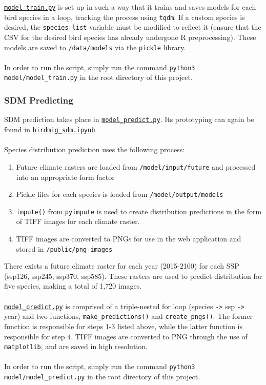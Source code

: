 \documentclass{article}
\begin{document}
\noindent \texttt{\href{run:../model/model\_train.py}{model\_train.py}} is set up in such a way that it trains and saves models for each bird species in a loop, tracking the process using \texttt{tqdm}. If a custom species is desired, the \texttt{species\_list} variable must be modified to reflect it (ensure that the CSV for the desired bird species has already undergone R preprocessing). These models are saved to \texttt{/data/models} via the \texttt{pickle} library.
\\\\
In order to run the script, simply run the command \texttt{python3 model/model\_train.py} in the root directory of this project.

\subsubsection{SDM Predicting}

SDM prediction takes place in \texttt{\href{run:../model/model\_predict.py}{model\_predict.py}}. Its prototyping can again be found in \texttt{\href{run:../model/birdmig\_sdm.ipynb}{birdmig\_sdm.ipynb}}.
\\\\
Species distribution prediction uses the following process:
\begin{enumerate}
	\item Future climate rasters are loaded from \texttt{/model/input/future} and processed into an appropriate form factor
	\item Pickle files for each species is loaded from \texttt{/model/output/models}
	\item \texttt{impute()} from \texttt{pyimpute} is used to create distribution predictions in the form of TIFF images for each climate raster.
	\item TIFF images are converted to PNGs for use in the web application and stored in \texttt{/public/png-images}
\end{enumerate}

\noindent There exists a future climate raster for each year (2015-2100) for each SSP (ssp126, ssp245, ssp370, ssp585). These rasters are used to predict distribution for five species, making a total of 1,720 images.
\\\\
\texttt{\href{run:../model/model\_predict.py}{model\_predict.py}} is comprised of a triple-nested for loop (species \verb|->| ssp \verb|->| year) and two functions, \texttt{make\_predictions()} and \texttt{create\_pngs()}. The former function is responsible for steps 1-3 listed above, while the latter function is responsible for step 4. TIFF images are converted to PNG through the use of \texttt{matplotlib}, and are saved in high resolution.
\\\\
In order to run the script, simply run the command \texttt{python3 model/model\_predict.py} in the root directory of this project.
\end{document}
